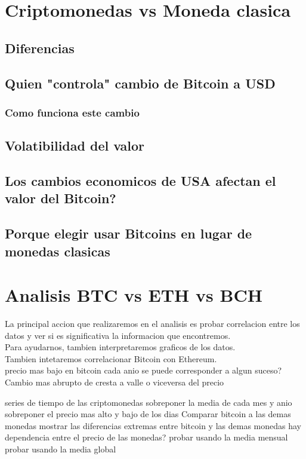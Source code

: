 \documentclass[12pt,letterpaper]{article}
\begin{document}
\section*{Criptomonedas vs Moneda clasica}

	\subsection*{Diferencias}
	
	\subsection*{Quien "controla" cambio de Bitcoin a USD}
	
		\subsubsection*{Como funciona este cambio}
        
	\subsection*{Volatibilidad del valor}

    \subsection*{Los cambios economicos de USA afectan el valor del Bitcoin?}

    \subsection*{Porque elegir usar Bitcoins en lugar de monedas clasicas}

\section*{Analisis BTC vs ETH vs BCH}
    La principal accion que realizaremos en el analisis es probar correlacion entre los datos y ver si es significativa la informacion que encontremos.
    \\
    Para ayudarnos, tambien interpretaremos graficos de los datos.
    \\
    Tambien intetaremos correlacionar Bitcoin con Ethereum.
    \\
    precio mas bajo en bitcoin cada anio
        se puede corresponder a algun suceso?
    Cambio mas abrupto de cresta a valle o viceversa del precio

    series de tiempo de las criptomonedas
        sobreponer la media de cada mes y anio
    sobreponer el precio mas alto y bajo de los dias
    Comparar bitcoin a las demas monedas
        mostrar las diferencias extremas entre bitcoin y las demas monedas
    hay dependencia entre el precio de las monedas?
        probar usando la media mensual
        probar usando la media global
\end{document}
